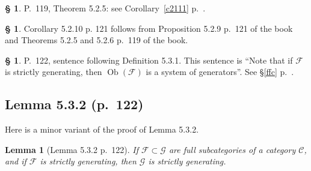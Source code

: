 \documentclass[12pt]{article}
\newtheorem{lem}[thm]{Lemma}
\theoremstyle{remark}
\theoremstyle{definition}
\newtheorem{s}[thm]{\S}
\newcommand{\cc}{\mathcal}
\newcommand{\C}{\mathcal C}
\newcommand{\F}{\mathcal F}
\newcommand{\G}{\mathcal G}
\DeclareMathOperator{\Ob}{Ob}
\begin{document}
%

\begin{s}
P.~119, Theorem 5.2.5: see Corollary~\ref{c2111} p.~\pageref{c2111}.
\end{s}

%

\begin{s}
Corollary 5.2.10 p. 121 follows from Proposition 5.2.9 p.~121 of the book and Theorems 5.2.5 and 5.2.6 p.~119 of the book.
\end{s}

%

\begin{s}
P.~122, sentence following Definition 5.3.1. This sentence is ``Note that if $\cc F$ is strictly generating, then $\Ob(\cc F)$ is a system of generators''. See \S\ref{ffc} p.~\pageref{ffc}.
\end{s}


\subsection{Lemma 5.3.2 (p.~122)} 

Here is a minor variant of the proof of Lemma 5.3.2. 

\begin{lem}[Lemma 5.3.2 p.~122]
If $\F\subset\G$ are full subcategories of a category $\C$, and if $\F$ is strictly generating, then $\G$ is strictly generating. 
\end{lem} 
\end{document}
